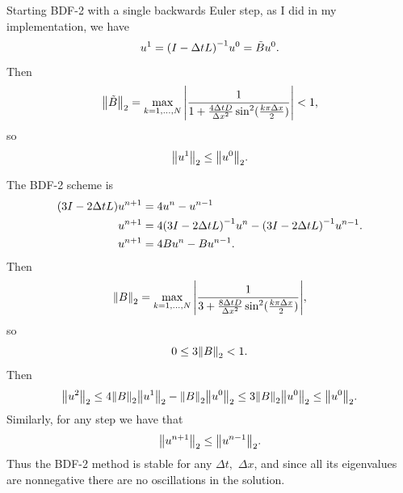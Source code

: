 \documentclass[12pt]{article}
\begin{document}
Starting BDF-2 with a single backwards Euler step, as I did in my implementation,
we have $$u^1 = \qty(I-\Delta t L)^{-1}u^0 = \tilde{B} u^{0}.$$
Then $$\norm{\tilde{B}}_2 = \max_{k=1,\dots,N} \abs{\dfrac{1}{1+\frac{4\Delta t D}{\Delta x^2}\sin^2(\frac{k\pi \Delta x}{2})}}<1,$$
so $$\norm{u^1}_2 \leq \norm{u^{0}}_2.$$

The BDF-2 scheme is
\begin{align*}
\qty(3I - 2\Delta t L)u^{n+1} &= 4u^n - u^{n-1} \\
u^{n+1} &= 4\qty(3I - 2\Delta t L)^{-1}u^n - \qty(3I - 2\Delta t L)^{-1} u^{n-1}.\\
u^{n+1} &= 4Bu^{n} - Bu^{n-1}.
\end{align*}
Then $$\norm{B}_2 = \max_{k=1,\dots, N} \abs{\dfrac{1}{3+\frac{8\Delta t D}{\Delta x^2}\sin^2(\frac{k\pi \Delta x}{2})}},$$
so $$0 \leq 3 \norm{B}_2 < 1.$$
Then $$\norm{u^{2}}_2 \leq 4\norm{B}_2 \norm{u^{1}}_2 - \norm{B}_2\norm{u^{0}}_2 \leq 3 \norm{B}_2 \norm{u^{0}}_2 \leq \norm{u^{0}}_2.$$
Similarly, for any step we have that $$\norm{u^{n+1}}_2 \leq \norm{u^{n-1}}_2.$$
Thus the BDF-2 method is stable for any $\Delta t,$ $\Delta x$, and since all its eigenvalues are nonnegative there are no oscillations in the solution.
\end{document}
